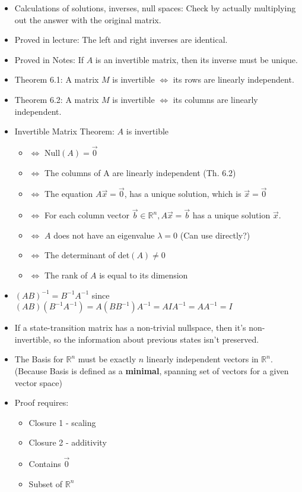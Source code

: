 \documentclass{article}
\begin{document}
\begin{itemize}
	\item Calculations of solutions, inverses, null spaces: {\color{red}Check} by actually multiplying out the answer with the original matrix.
	\item Proved in lecture: The left and right inverses are identical.
	\item Proved in Notes: If $A$ is an invertible matrix, then its inverse must be unique.
	\item Theorem 6.1: A matrix $M$ is invertible $\iff$ its rows are linearly independent.
	\item Theorem 6.2: A matrix $M$ is invertible $\iff$ its columns are linearly independent.
	\item Invertible Matrix Theorem: $A$ is invertible
	\begin{itemize}
		\item $\iff$ Null$(A)=\vec{0}$
		\item $\iff$ The columns of A are linearly independent (Th. 6.2)
		\item $\iff$ The equation $A\vec{x} = \vec{0}$, has a unique solution, which is $\vec{x} = \vec{0}$
		\item $\iff$ For each column vector $\vec{b}\in\mathbb{R}^n, A\vec{x} = \vec{b}$ has a unique solution $\vec{x}.$
		\item $\iff$ $A$ does not have an eigenvalue $\lambda = 0$ (Can use directly?)
		\item $\iff$ The determinant of det$(A) \neq 0$
		\item $\iff$ The rank of $A$ is equal to its dimension
	\end{itemize}
	\item $(AB)^{-1} = B^{-1}A^{-1}$ since $(AB)(B^{-1}A^{-1}) = A(BB^{-1})A^{-1} = AIA^{-1} = AA^{-1} = I$
	\item If a state-transition matrix has a non-trivial nullspace, then it's non-invertible, so the information about previous states isn't preserved.
\end{itemize}

\begin{itemize}
	\item The Basis for $\mathbb{R}^n$ must be exactly $n$ linearly independent vectors in $\mathbb{R}^n$. (Because Basis is defined as a \textbf{minimal}, spanning set of vectors for a given vector space)
	\item Proof requires:
	\begin{itemize}
		\item Closure 1 - scaling
		\item Closure 2 - additivity
		\item Contains $\vec{0}$
		\item Subset of $\mathbb{R}^n$
	\end{itemize}
\end{itemize}
\end{document}
